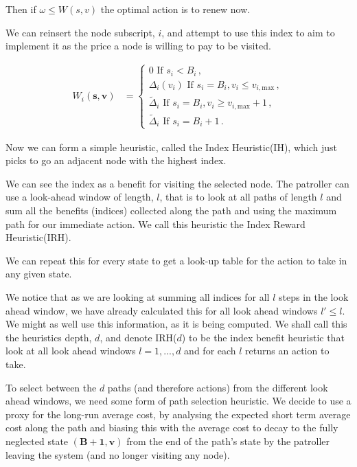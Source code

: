 \documentclass[a4paper,10pt]{article}
\theoremstyle{definition}
\theoremstyle{definition}
\theoremstyle{remark}
\theoremstyle{definition}
\begin{document}
Then if $\omega \leq W(s,v)$ the optimal action is to renew now.

We can reinsert the node subscript, $i$, and attempt to use this index to aim to implement it as the price a node is willing to pay to be visited.

\begin{align*}
W_{i}(\bm{s},\bm{v})&=\begin{cases}
0 \text{ If } s_{i}<B_{i} \, , \\
\Delta_{i}(v_{i}) \text{ If } s_{i}=B_{i} , v_{i} \leq v_{i,\text{max}} \, , \\
\widetilde{\Delta}_{i} \text{ If } s_{i}=B_{i} , v_{i} \geq v_{i,\text{max}}+1 \, , \\
\widetilde{\Delta}_{i} \text{ If } s_{i}=B_{i}+1 \, .
\end{cases}
\end{align*}

Now we can form a simple heuristic, called the Index Heuristic(IH), which just picks to go an adjacent node with the highest index.

We can see the index as a benefit for visiting the selected node. The patroller can use a look-ahead window of length, $l$, that is to look at all paths of length $l$ and sum all the benefits (indices) collected along the path and using the maximum path for our immediate action. We call this heuristic the Index Reward Heuristic(IRH).

We can repeat this for every state to get a look-up table for the action to take in any given state.

We notice that as we are looking at summing all indices for all $l$ steps in the look ahead window, we have already calculated this for all look ahead windows $l' \leq l$. We might as well use this information, as it is being computed. We shall call this the heuristics depth, $d$, and denote IRH($d$) to be the index benefit heuristic that look at all look ahead windows $l=1,...,d$ and for each $l$ returns an action to take.

To select between the $d$ paths (and therefore actions) from the different look ahead windows, we need some form of path selection heuristic. We decide to use a proxy for the long-run average cost, by analysing the expected short term average cost along the path and biasing this with the average cost to decay to the fully neglected state $(\bm{B}+\bm{1},\bm{v})$ from the end of the path's state by the patroller leaving the system (and no longer visiting any node).
\end{document}
